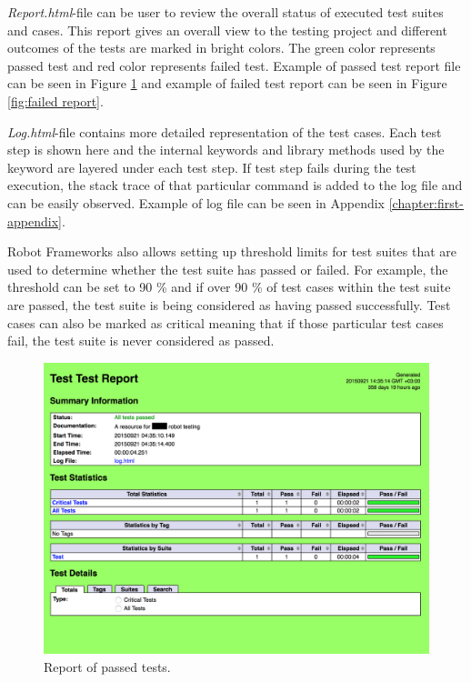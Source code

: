\emph{Report.html}-file can be user to review the overall status of executed test suites and cases. This report gives an overall view to the testing project and different outcomes of the tests are marked in bright colors. The green color represents passed test and red color represents failed test. Example of passed test report file can be seen in Figure \ref{fig:passed report} and example of failed test report can be seen in Figure \ref{fig:failed report}.

\emph{Log.html}-file contains more detailed representation of the test cases. Each test step is shown here and the internal keywords and library methods used by the keyword are layered under each test step. If test step fails during the test execution, the stack trace of that particular command is added to the log file and can be easily observed. Example of log file can be seen in Appendix \ref{chapter:first-appendix}.

Robot Frameworks also allows setting up threshold limits for test suites that are used to determine whether the test suite has passed or failed. For example, the threshold can be set to 90 \% and if over 90 \% of test cases within the test suite are passed, the test suite is being considered as having passed successfully. Test cases can also be marked as critical meaning that if those particular test cases fail, the test suite is never considered as passed.

\begin{figure}[ht]
  \begin{center}
    \includegraphics[width=\textwidth]{images/passed_report.png}
    \caption{Report of passed tests.}
    \label{fig:passed report}
  \end{center}
\end{figure}
\FloatBarrier

